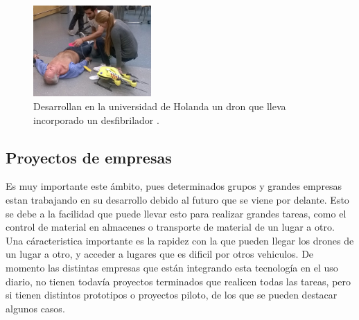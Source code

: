 \begin{figure}[H]
	\centering
		\includegraphics[width=0.4\textwidth]{imgs/drone_desfibrilador.jpg}
		\caption{Desarrollan en la universidad de Holanda un dron que lleva incorporado un desfibrilador .}
	\label{fig: Drone con desfibrilador para emergencias.}
\end{figure} 



\subsection{Proyectos de empresas }
\hspace{1 cm} Es muy importante este \'ambito, pues determinados grupos y grandes empresas estan trabajando en su desarrollo debido al futuro que se viene por delante. Esto se debe a la facilidad que puede llevar esto para realizar grandes tareas, como el control de material en almacenes o transporte de material de un lugar a otro. Una c\'aracteristica importante es la rapidez con la que pueden llegar los drones de un lugar a otro, y acceder a lugares que es dificil por otros vehiculos. De momento las distintas empresas que est\'an integrando esta tecnolog\'ia en el uso diario, no tienen todav\'ia proyectos terminados que realicen todas las tareas, pero si tienen distintos prototipos o proyectos piloto, de los que se pueden destacar algunos casos.


